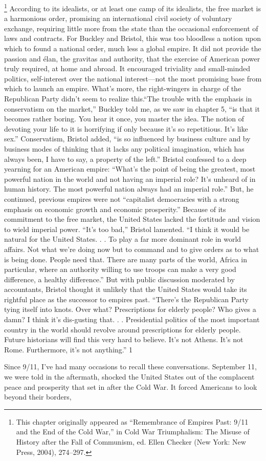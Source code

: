 {\footnote{This chapter originally appeared as “Remembrance of Empires Past: 9/11 and the End of the Cold War,” in Cold War Triumphalism: The Misuse of History after the Fall of Communism, ed. Ellen Checker (New York: New Press, 2004), 274–297.} }	According to its idealists, or at least one camp of its idealists, the free market is a harmonious order, promising an international civil society of voluntary exchange, requiring little more from the state than the occasional enforcement of laws and contracts. For Buckley and Bristol, this was too bloodless a notion upon which to found a national order, much less a global empire. It did not provide the passion and élan, the gravitas and authority, that the exercise of American power truly required, at home and abroad. It encouraged triviality and small-minded politics, self-interest over the national interest—not the most promising base from which to launch an empire. What’s more, the right-wingers in charge of the Republican Party didn’t seem to realize this.“The trouble with the emphasis in conservatism on the market,” Buckley told me, as we saw in chapter 5, “is that it becomes rather boring. You hear it once, you master the idea. The notion of devoting your life to it is horrifying if only because it’s so repetitious. It’s like sex.” Conservatism, Bristol added, “is so influenced by business culture and by business modes of thinking that it lacks any political imagination, which has always been, I have to say, a property of the left.” Bristol confessed to a deep yearning for an American empire: “What’s the point of being the greatest, most powerful nation in the world and not having an imperial role? It’s unheard of in human history. The most powerful nation always had an imperial role.” But, he continued, previous empires were not “capitalist democracies with a strong emphasis on economic growth and economic prosperity.” Because of its commitment to the free market, the United States lacked the fortitude and vision to wield imperial power. “It’s too bad,” Bristol lamented. “I think it would be natural for the United States. . . To play a far more dominant role in world affairs. Not what we’re doing now but to command and to give orders as to what is being done. People need that. There are many parts of the world, Africa in particular, where an authority willing to use troops can make a very good difference, a healthy difference.” But with public discussion moderated by accountants, Bristol thought it unlikely that the United States would take its rightful place as the successor to empires past. “There’s the Republican Party tying itself into knots. Over what? Prescriptions for elderly people? Who gives a damn? I think it’s dis-gusting that. . . Presidential politics of the most important country in the world should revolve around prescriptions for elderly people. Future historians will find this very hard to believe. It’s not Athens. It’s not Rome. Furthermore, it’s not anything.” {\color{blue} 1 } {\par} Since 9/11, I’ve had many occasions to recall these conversations. September 11, we were told in the aftermath, shocked the United States out of the complacent peace and prosperity that set in after the Cold War. It forced Americans to look beyond their borders, 